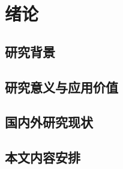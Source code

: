 \section{绪论}

\subsection{研究背景}

\subsection{研究意义与应用价值}

\subsection{国内外研究现状}

\subsection{本文内容安排}

